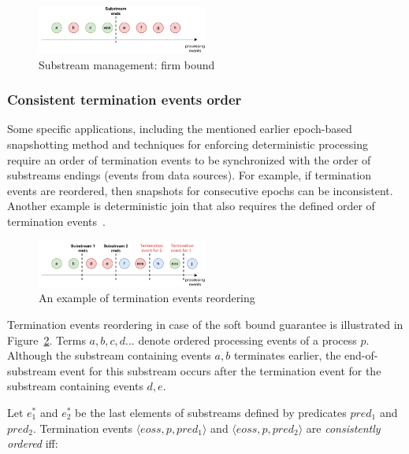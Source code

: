 \begin{figure}[htbp]
  \centering
  \includegraphics[width=0.50\textwidth]{pics/strict-guarantee.pdf}
  \caption{Substream management: firm bound}
  \label{strict_guarantees}
\end{figure}

\subsubsection{Consistent termination events order}
Some specific applications, including the mentioned earlier epoch-based snapshotting method and techniques for enforcing deterministic processing~\cite{we2018adbis} require an order of termination events to be synchronized with the order of substreams endings (events from data sources). For example, if termination events are reordered, then snapshots for consecutive epochs can be inconsistent. Another example is deterministic join that also requires the defined order of termination events~\cite{gulisano2016scalejoin}.

\begin{figure}[htbp]
  \centering
  \includegraphics[width=0.50\textwidth]{pics/notifications-reordering.pdf}
  \caption{An example of termination events reordering}
  \label{notifications_reordering}
\end{figure}

Termination events reordering in case of the soft bound guarantee is illustrated in Figure~\ref{notifications_reordering}. Terms $a,b,c,d...$ denote ordered processing events of a process $p$. Although the substream containing events $a,b$ terminates earlier, the end-of-substream event for this substream occurs after the termination event for the substream containing events $d,e$. 

Let $e^{*}_1$ and $e^{*}_2$ be the last elements of substreams defined by predicates $pred_1$ and $pred_2$. Termination events $\langle eoss, p, pred_1\rangle$ and $\langle eoss, p, pred_2\rangle$ are {\em consistently ordered} iff:

